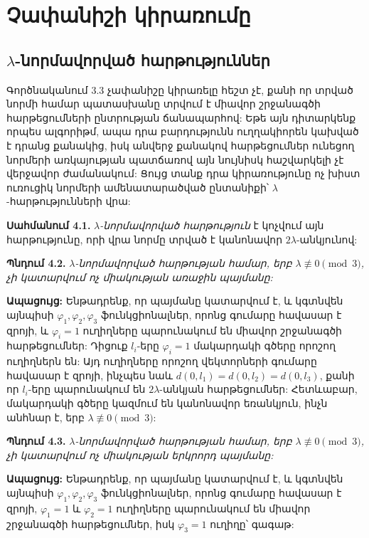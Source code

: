 \documentclass[12pt,a4paper]{article}
\numberwithin{equation}{section}
\numberwithin{figure}{section}
\begin{document}
\section{Չափանիշի կիրառումը}

\subsection{\texorpdfstring{$\lambda$}{lambda}-նորմավորված հարթություններ}

Գործնականում 3.3 չափանիշը կիրառելը հեշտ չէ, քանի որ տրված նորմի համար պատասխանը տրվում է միավոր շրջանագծի հարթեցումների ընտրության ճանապարհով: Եթե այն դիտարկենք որպես ալգորիթմ, ապա դրա բարդությունն ուղղակիորեն կախված է դրանց քանակից, իսկ անվերջ քանակով հարթեցումներ ունեցող նորմերի առկայության պատճառով այն նույնիսկ հաշվարկելի չէ վերջավոր ժամանակում: Ցույց տանք դրա կիրառությունը ոչ խիստ ուռուցիկ նորմերի ամենատարածված ընտանիքի՝ $\lambda$-հարթությունների վրա:

\textbf{Սահմանում 4.1.} \textit{$\lambda$-նորմավորված հարթություն} է կոչվում այն հարթությունը, որի վրա նորմը տրված է կանոնավոր $2\lambda$-անկյունով:

\textbf{Պնդում 4.2.} \textit{$\lambda$-նորմավորված հարթության համար, երբ $\lambda \not\equiv 0 \pmod 3$, չի կատարվում ոչ միակության առաջին պայմանը:}

\textbf{Ապացույց:} Ենթադրենք, որ պայմանը կատարվում է, և կգտնվեն այնպիսի $\varphi_1, \varphi_2, \varphi_3$ ֆունկցիոնալներ, որոնց գումարը հավասար է զրոյի, և $\varphi_i = 1$ ուղիղները պարունակում են միավոր շրջանագծի հարթեցումներ: Դիցուք $l_i$-երը $\varphi_i = 1$ մակարդակի գծերը որոշող ուղիղներն են: Այդ ուղիղները որոշող վեկտորների գումարը հավասար է զրոյի, ինչպես նաև $d(0, l_1) = d(0, l_2) = d(0, l_3)$, քանի որ $l_i$-երը պարունակում են $2\lambda$-անկյան հարթեցումներ: Հետևաբար, մակարդակի գծերը կազմում են կանոնավոր եռանկյուն, ինչն անհնար է, երբ $\lambda \not\equiv 0 \pmod 3$: 

\textbf{Պնդում 4.3.} \textit{$\lambda$-նորմավորված հարթության համար, երբ $\lambda \not\equiv 0 \pmod 3$, չի կատարվում ոչ միակության երկրորդ պայմանը:}

\textbf{Ապացույց:} Ենթադրենք, որ պայմանը կատարվում է, և կգտնվեն այնպիսի $\varphi_1, \varphi_2, \varphi_3$ ֆունկցիոնալներ, որոնց գումարը հավասար է զրոյի, $\varphi_1 = 1$ և $\varphi_2 = 1$ ուղիղները պարունակում են միավոր շրջանագծի հարթեցումներ, իսկ $\varphi_3 = 1$ ուղիղը՝ գագաթ:
\end{document}
